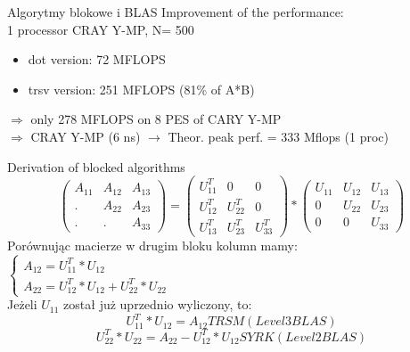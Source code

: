 	\begin{frame}{Algorytmy blokowe i BLAS}
	Improvement of the performance: \\ 
	1 processor CRAY Y-MP, N= 500 \\
	\begin{itemize}
		\item dot version: 72 MFLOPS
		\item trsv version: 251 MFLOPS (81\% of A*B)
	\end{itemize}
	$\Rightarrow$ only 278 MFLOPS on 8 PES of CARY Y-MP \\
	$\Rightarrow$ CRAY Y-MP (6 ns) $\rightarrow$ Theor. peak perf. = 333 Mflops (1 proc)
	\end{frame}
	\begin{frame}{Derivation of blocked algorithms}
	$$
		\begin{pmatrix}
		A_{11} & A_{12} & A_{13} \\
		. & A_{22} & A_{23} \\
		. & . & A_{33}
		\end{pmatrix}
		=
		\begin{pmatrix}
		U_{11}^T & 0 & 0 \\
		U_{12}^T & U_{22}^T & 0 \\
		U_{13}^T & U_{23}^T & U_{33}^T
		\end{pmatrix}
		*
		\begin{pmatrix}
		U_{11} & U_{12}  & U_{13} \\
		0 & U_{22} & U_{23} \\
		0 & 0 & U_{33}
		\end{pmatrix}
	$$
	Porównując macierze w drugim bloku kolumn mamy:
	$
	\begin{cases}
		A_{12} = U_{11}^T * U_{12} \\
		A_{22} = U_{12}^T * U_{12} + U_{22}^T * U_{22}
	\end{cases}
	$ \\ 
	Jeżeli $U_{11}$ został już uprzednio wyliczony, to:
	$$
		U_{11}^T * U_{12} = A_{12} TRSM (Level 3 BLAS)
	$$
	$$
		U_{22}^T * U_{22} = A_{22} - U_{12}^T * U_{12} SYRK(Level 2 BLAS)
	$$
	\end{frame}
